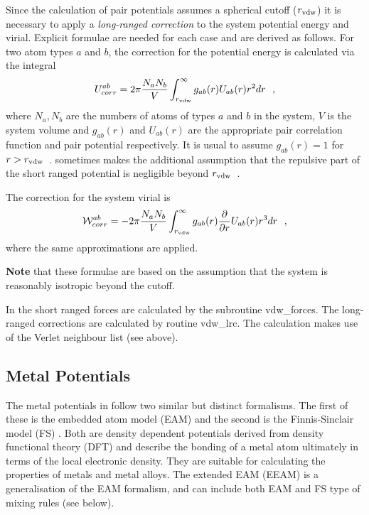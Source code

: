 Since the calculation of pair potentials assumes a spherical
cutoff ($r_{\rm vdw}$) it is necessary to apply a {\em long-ranged
correction} to the
system potential energy and virial.  Explicit formulae are needed
for each case and are derived as follows.  For two atom types $a$
and $b$, the correction for the potential energy is calculated via
the integral
\begin{equation}
U_{corr}^{ab} = 2\pi
\frac{N_{a}N_{b}}{V}\int_{r_{\rm vdw}}^{\infty}g_{ab}(r)U_{ab}(r)r^{2}dr~~,
\end{equation}
where $N_{a},N_{b}$ are the numbers of atoms of types $a$ and $b$
in the system, $V$ is the system volume and $g_{ab}(r)$ and
$U_{ab}(r)$ are the appropriate pair correlation function and pair
potential respectively.  It is usual to assume $g_{ab}(r)=1$ for
$r>r_{\rm vdw}$~.  \D sometimes makes the additional assumption that
the repulsive part of the short ranged potential is negligible
beyond $r_{\rm vdw}$~.

The correction for the system virial is
\begin{equation}
{\cal W}_{corr}^{ab} = -2\pi \frac{N_{a}N_{b}}{V}
\int_{r_{\rm vdw}}^{\infty}g_{ab}(r) \frac{\partial}{\partial
r}U_{ab}(r)r^{3}dr~~,
\end{equation}
where the same approximations are applied.

{\bf Note} that these formulae are based on the assumption that the
system is reasonably isotropic beyond the cutoff.

In \D the short ranged forces are calculated by the subroutine
{\sc vdw\_forces}.  The long-ranged corrections are calculated by
routine {\sc vdw\_lrc}.  The calculation makes use of the
Verlet neighbour list (see above).

\subsection{Metal Potentials}
\label{metal}

The metal potentials in \D follow two similar but distinct formalisms.
The first of these is the embedded atom model (EAM)
\cite{baskes-84a,baskes-86a} and the second is the Finnis-Sinclair
model (FS) \cite{finnis-84a}.  Both are density dependent potentials
derived from density functional theory (DFT) and describe the bonding
of a metal atom ultimately in terms of the local electronic density.
They are suitable for calculating the properties of metals
 and metal alloys.  The extended EAM (EEAM)
is a generalisation of the EAM formalism, and can include both EAM
and FS type of mixing rules (see below).

